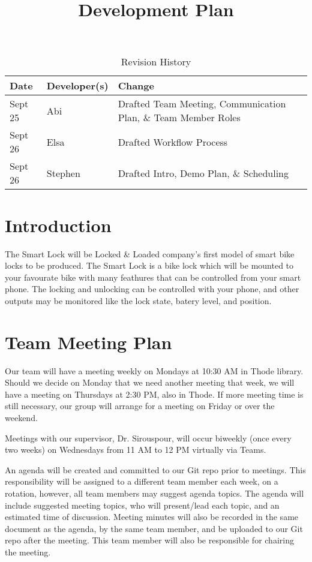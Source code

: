 \documentclass{article}
\title{Development Plan\\\progname}
\author{\authname}
\date{}
\begin{document}
\maketitle

\begin{table}[hp]
\caption{Revision History} \label{TblRevisionHistory}
\begin{tabularx}{\textwidth}{llX}
\toprule
\textbf{Date} & \textbf{Developer(s)} & \textbf{Change}\\
\midrule
Sept 25 & Abi & Drafted Team Meeting, Communication Plan, \& Team Member Roles\\
Sept 26 & Elsa & Drafted Workflow Process\\
Sept 26 & Stephen & Drafted Intro, Demo Plan, \& Scheduling\\
\bottomrule

\end{tabularx}
\end{table}

\newpage



\section{Introduction}

The Smart Lock will be Locked \& Loaded company's first model of smart bike locks to be produced. The Smart Lock is a bike lock which will be mounted to your favourate bike with many feathures that can be controlled from your smart phone. The locking and unlocking can be controlled with your phone, and other outputs may be monitored like the lock state, batery level, and position.

\section{Team Meeting Plan}

Our team will have a meeting weekly on Mondays at 10:30 AM in Thode library.  Should we decide on Monday that we need another meeting that week, we will have a meeting on Thursdays at 2:30 PM, also in Thode.  If more meeting time is still necessary, our group will arrange for a meeting on Friday or over the weekend.

Meetings with our supervisor, Dr. Sirouspour, will occur biweekly (once every two weeks) on Wednesdays from 11 AM to 12 PM virtually via Teams.

An agenda will be created and committed to our Git repo prior to meetings.  This responsibility will be assigned to a different team member each week, on a rotation, however, all team members may suggest agenda topics.  The agenda will include suggested meeting topics, who will present/lead each topic, and an estimated time of discussion. Meeting minutes will also be recorded in the same document as the agenda, by the same team member, and be uploaded to our Git repo after the meeting.  This team member will also be responsible for chairing the meeting. 
\end{document}
